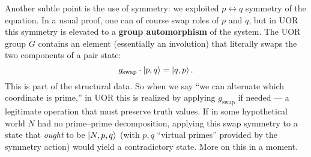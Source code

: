 \documentclass[12pt]{article}
\begin{document}
Another subtle point is the use of symmetry: we exploited $p \leftrightarrow q$ symmetry of the equation. In a usual proof, one can of course swap roles of $p$ and $q$, but in UOR this symmetry is elevated to a \textbf{group automorphism} of the system. The UOR group $G$ contains an element (essentially an involution) that literally swaps the two components of a pair state:
\[
g_{\text{swap}}\cdot\ket{p,q} = \ket{q,p}.
\]
This is part of the structural data. So when we say ``we can alternate which coordinate is prime,'' in UOR this is realized by applying $g_{\text{swap}}$ if needed --- a legitimate operation that must preserve truth values. If in some hypothetical world $N$ had no prime--prime decomposition, applying this swap symmetry to a state that \emph{ought} to be $\ket{N,p,q}$ (with $p,q$ “virtual primes” provided by the symmetry action) would yield a contradictory state. More on this in a moment.
\end{document}
